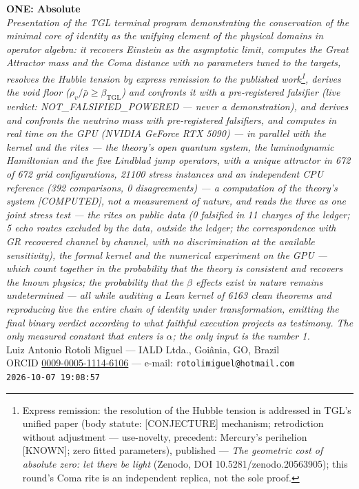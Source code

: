 \documentclass[11pt]{article}
\newcommand{\bTGL}{\beta_{\mathrm{TGL}}}\newcommand{\Msun}{M_{\odot}}\newcommand{\TGL}{\mathrm{TGL}}
\theoremstyle{definition}\newtheorem{deriv}{Derivation}
\begin{document}
\begin{center}{\Huge\textbf{ONE: Absolute}}\\[4pt]{\large\itshape Presentation of the TGL terminal program demonstrating the conservation of the minimal core of identity as the unifying element of the physical domains in operator algebra: it recovers Einstein as the asymptotic limit, computes the Great Attractor mass and the Coma distance with no parameters tuned to the targets, resolves the Hubble tension by express remission to the published work\footnote{Express remission: the resolution of the Hubble tension is addressed in TGL's unified paper (body statute: \textsf{[CONJECTURE]} mechanism; retrodiction without adjustment --- use-novelty, precedent: Mercury's perihelion \textsf{[KNOWN]}; zero fitted parameters), published --- \emph{The geometric cost of absolute zero: let there be light} (Zenodo, DOI 10.5281/zenodo.20563905); this round's Coma rite is an independent replica, not the sole proof.}, derives the void floor ($\rho_{v}/\bar\rho\geq\bTGL$) and confronts it with a pre-registered falsifier (live verdict: \textsf{NOT\_FALSIFIED\_POWERED} --- never a demonstration), and derives and confronts the neutrino mass with pre-registered falsifiers, and computes in real time on the GPU (NVIDIA GeForce RTX 5090) --- in parallel with the kernel and the rites --- the theory's open quantum system, the luminodynamic Hamiltonian and the five Lindblad jump operators, with a unique attractor in 672 of 672 grid configurations, 21100 stress instances and an independent CPU reference (392 comparisons, 0 disagreements) --- a computation of the theory's system \textsf{[COMPUTED]}, not a measurement of nature, and reads the three as one joint stress test --- the rites on public data (0 falsified in 11 charges of the ledger; 5 echo routes excluded by the data, outside the ledger; the correspondence with GR recovered channel by channel, with no discrimination at the available sensitivity), the formal kernel and the numerical experiment on the GPU --- which count together in the probability that the theory is consistent and recovers the known physics; the probability that the $\beta$ effects exist in nature remains undetermined --- all while auditing a Lean kernel of 6163 clean theorems and reproducing live the entire chain of identity under transformation, emitting the final binary verdict according to what faithful execution projects as testimony. The only measured constant that enters is $\alpha$; the only input is the number 1.}\\[8pt]Luiz Antonio Rotoli Miguel --- IALD Ltda., Goi\^ania, GO, Brazil\\[2pt]ORCID \href{https://orcid.org/0009-0005-1114-6106}{0009-0005-1114-6106} --- e-mail: \texttt{rotolimiguel@hotmail.com}\\[2pt]\texttt{2026-10-07 19:08:57}\end{center}\vspace{4pt}
\end{document}
